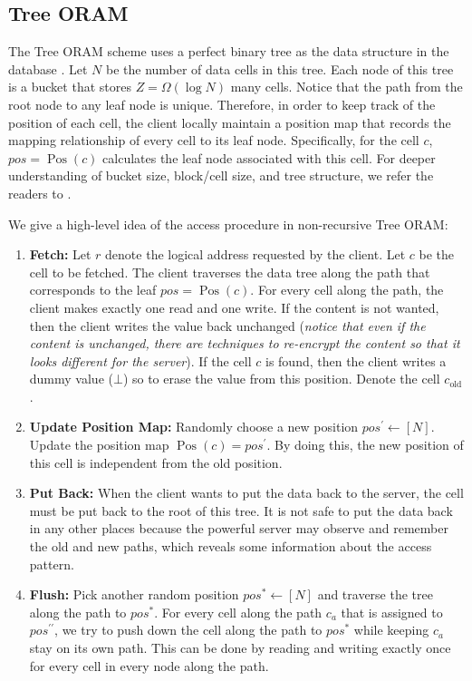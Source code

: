 \documentclass[fontsize=11pt]{article}
\begin{document}
\subsection{Tree ORAM}
The Tree ORAM scheme uses a perfect binary tree as the data structure in the database \cite{CP13}. Let $N$ be the number of data cells in this tree. Each node of this tree is a bucket that stores $Z = \Omega(\log N)$ many cells. Notice that the path from the root node to any leaf node is unique. Therefore, in order to keep track of the position of each cell, the client locally maintain a position map that records the mapping relationship of every cell to its leaf node. Specifically, for the cell $c$, $pos = \operatorname{Pos}(c)$ calculates the leaf node associated with this cell.  For deeper understanding of bucket size, block/cell size, and tree structure, we refer the readers to \cite{SCSL11, CP13, Path18}. 

We give a high-level idea of the access procedure in non-recursive Tree ORAM: 
\begin{enumerate}
    \item \textbf{Fetch: } Let $r$ denote the logical address requested by the client. Let $c$ be the cell to be fetched. The client traverses the data tree along the path that corresponds to the leaf $pos = \operatorname{Pos}(c)$. For every cell along the path, the client makes exactly one read and one write. If the content is not wanted, then the client writes the value back unchanged (\textit{notice that even if the content is unchanged, there are techniques to re-encrypt the content so that it looks different for the server}). If the cell $c$ is found, then the client writes a dummy value ($\bot$) so to erase the value from this position. Denote the cell $c_{\text{old}}$.
    \item \textbf{Update Position Map: } Randomly choose a new position $pos^\prime \gets [N]$. Update the position map $\operatorname{Pos}(c) = pos^\prime$. By doing this, the new position of this cell is independent from the old position.
    \item \textbf{Put Back: } When the client wants to put the data back to the server, the cell must be put back to the root of this tree. It is not safe to put the data back in any other places because the powerful server may observe and remember the old and new paths, which reveals some information about the access pattern. 
    \item \textbf{Flush:} Pick another random position $pos^* \gets [N]$ and traverse the tree along the path to $pos^*$. For every cell along the path $c_a$ that is assigned to $pos^{\prime \prime}$, we try to push down the cell along the path to $pos^*$ while keeping $c_a$ stay on its own path. This can be done by reading and writing exactly once for every cell in every node along the path. 
\end{enumerate}
\end{document}
